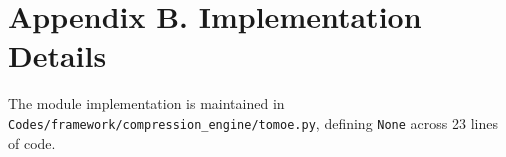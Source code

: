 \section*{Appendix B. Implementation Details}
The module implementation is maintained in \texttt{Codes/framework/compression\_engine/tomoe.py}, defining \texttt{None} across 23 lines of code.
